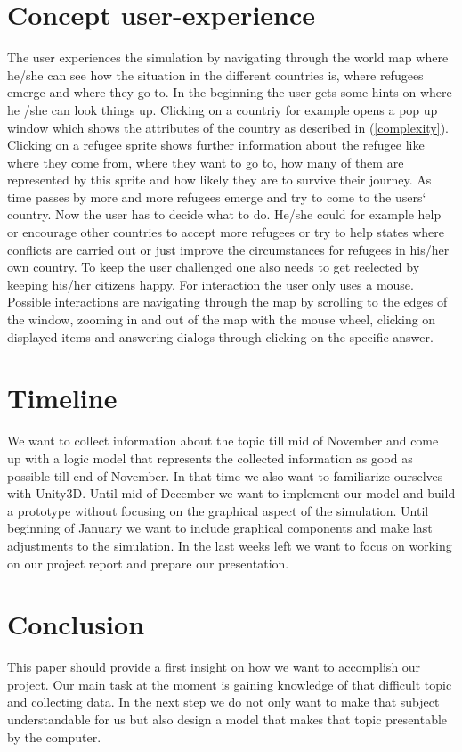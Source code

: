\documentclass{acm_proc_article-sp}
\begin{document}
\section{Concept user-experience}
The user experiences the simulation by navigating through the world map where he/she can see how the situation in the different countries is, where refugees emerge and where they go to. In the beginning the user gets some hints on where he /she can look things up. Clicking on a countriy for example opens a pop up window which shows the attributes of the country as described in (\ref{complexity}). Clicking on a refugee sprite shows further information about the refugee like where they come from, where they want to go to, how many of them are represented by this sprite and how likely they are to survive their journey. As time passes by more and more refugees emerge and try to come to the users` country. Now the user has to decide what to do. He/she could for example help or encourage other countries to accept more refugees or try to help states where conflicts are carried out or just improve the circumstances for refugees in his/her own country.
To keep the user challenged one also needs to get reelected by keeping his/her citizens happy. For interaction the user only uses a mouse. Possible interactions are navigating through the map by scrolling to the edges of the window, zooming in and out of the map with the mouse wheel, clicking on displayed items and answering dialogs through clicking on the specific answer.

\section{Timeline}
We want to collect information about the topic till mid of November and come up with a logic model that represents the collected information as good as possible till end of November. In that time we also want to familiarize ourselves with Unity3D. Until mid of  December we want to implement our model and build a prototype without focusing on the graphical aspect of the simulation.  Until beginning of January we want to include graphical components and make last adjustments to the simulation. In the last weeks left we want to focus on working on our project report and prepare our presentation.

\section{Conclusion}
This paper should provide a first insight on how we want to accomplish our project. Our main task at the moment is gaining knowledge of that difficult topic and collecting data. In the next step we do not only want to make that subject understandable for us but also design a model that makes that topic 	presentable by the computer. 


 
\end{document}
